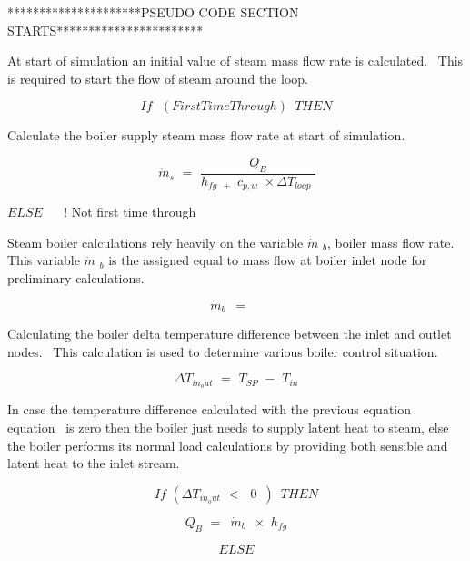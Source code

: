 *********************PSEUDO CODE SECTION STARTS***********************

At start of simulation an initial value of steam mass flow rate is calculated.~ This is required to start the flow of steam around the loop.

\begin{equation}
If\,\,\,\,(FirstTimeThrough)\,\,\,THEN
\end{equation}

Calculate the boiler supply steam mass flow rate at start of simulation.

\begin{equation}
\,{\dot m_s}\,\, = \,\,\frac{{{Q_B}}}{{{h_{fg\,\,\, + }}\,\,{c_{p,w}}\,\, \times \Delta {T_{loop}}\,\,}}
\end{equation}

\(ELSE\) ~~ ! Not first time through

Steam boiler calculations rely heavily on the variable \(\dot m\) \(_{b}\), boiler mass flow rate.~ This variable \(\dot m\) \(_{b}\) is the assigned equal to mass flow at boiler inlet node for preliminary calculations.

\begin{equation}
\,{\dot m_b}\,\,\, = \,\,\,\mathop {\,{{\dot m}_{Inlet_Node}}}\limits^{}
\end{equation}

Calculating the boiler delta temperature difference between the inlet and outlet nodes.~ This calculation is used to determine various boiler control situation.

\begin{equation}
\Delta {T_{in_out}}\,\, = \,\,{T_{SP}}\,\, - \,\,{T_{in}}
\end{equation}

In case the temperature difference calculated with the previous equation equation~ is zero then the boiler just needs to supply latent heat to steam, else the boiler performs its normal load calculations by providing both sensible and latent heat to the inlet stream.

\begin{equation}
If\,\,(\Delta {T_{in_out}}\,\, < \,\,\,\,0\,\,\,)\,\,\,THEN
\end{equation}

\begin{equation}
{Q_B}\,\, = \,\,\,{\dot m_b}\,\,\, \times \,\,{h_{fg}}
\end{equation}

\begin{equation}
ELSE
\end{equation}

